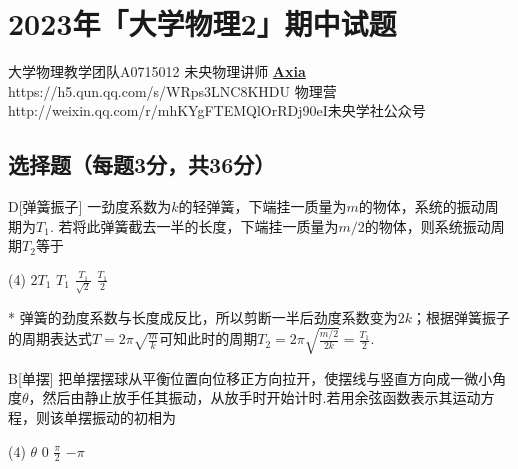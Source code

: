 \chapter{2023年「大学物理2」期中试题}

\date{2023年12月3日}{大学物理教学团队}{A0715012}
{未央物理讲师 \href{https://qm.qq.com/q/UPbGudx8cK}{\textbf{Axia}}}
{https://h5.qun.qq.com/s/WRps3LNC8K}{HDU 物理营}
{http://weixin.qq.com/r/mhKYgFTEMQlOrRDj90eI}{未央学社公众号}

\section{选择题（每题3分，共36分）}
\begin{choice}{D}[弹簧振子]
    一劲度系数为$k$的轻弹簧，下端挂一质量为$m$的物体，系统的振动周期为$T_1$. 若将此弹簧截去一半的长度，下端挂一质量为$m/2$的物体，则系统振动周期$T_2$等于
\begin{tasks}(4)
    \task $2T_1$
    \task $T_1$
    \task $\frac{T_1}{\sqrt2}$
    \task $\frac{T_1}{2}$
\end{tasks}
\end{choice}
\begin{solution}*
    弹簧的劲度系数与长度成反比，所以剪断一半后劲度系数变为$2k$；根据弹簧振子的周期表达式$T=2\pi\sqrt{\frac mk}$可知此时的周期$T_2=2\pi\sqrt{\frac{m/2}{2k}}=\frac{T_1}{2}$.
\end{solution}

\begin{choice}{B}[单摆]
    把单摆摆球从平衡位置向位移正方向拉开，使摆线与竖直方向成一微小角度$\theta$，然后由静止放手任其振动，从放手时开始计时.若用余弦函数表示其运动方程，则该单摆振动的初相为
    \begin{tasks}(4)
        \task $\theta$
        \task $0$
        \task $\frac\pi2$
        \task $-\pi$
    \end{tasks}
\end{choice}

